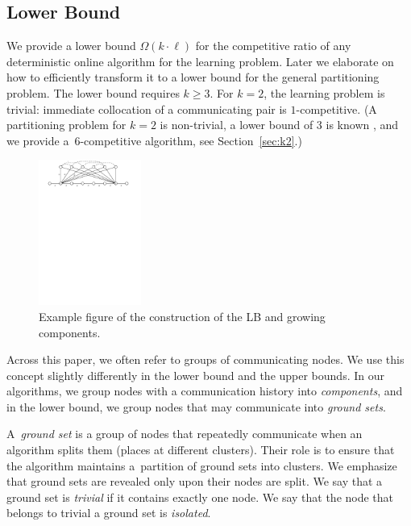 \documentclass[a4paper,anonymous,USenglish]{lipics-v2019}
\begin{document}
\subsection{Lower Bound}

\label{sec:lowerbound}


We provide a lower bound $\Omega(k\cdot \ell)$ for the competitive ratio of any deterministic online algorithm for the learning problem.
Later we elaborate on how to efficiently transform it to a lower bound for the general partitioning problem.
The lower bound requires $k\geq 3$.
For $k=2$, the learning problem is trivial: immediate collocation of a communicating pair is $1$-competitive.
(A partitioning problem for $k=2$ is non-trivial, a lower bound of $3$ is known \cite{repartition-disc}, and we provide a~$6$-competitive algorithm, see Section~\ref{sec:k2}.)




\begin{figure}[H]
	\centering
	\includegraphics[width=0.3\textwidth]{figs/substitute}
	\caption{Example figure of the construction of the LB and growing components.}
	\label{fig:nptree-construction}
\end{figure}


Across this paper, we often refer to groups of communicating nodes.
We use this concept slightly differently in the lower bound and the upper bounds.
In our algorithms, we group nodes with a communication history into \emph{components}, and in the lower bound, we group nodes that may communicate into \emph{ground sets}.


A~\emph{ground set} is a group of nodes that repeatedly communicate when an algorithm splits them (places at different clusters).
Their role is to ensure that the algorithm maintains a~partition of ground sets into clusters.
We emphasize that ground sets are revealed only upon their nodes are split.
We say that a ground set is \emph{trivial} if it contains exactly one node.
We say that the node that belongs to trivial a ground set is \emph{isolated}.
\end{document}

